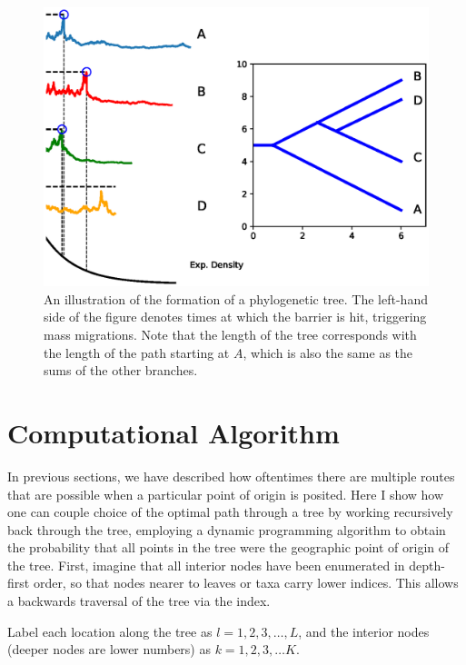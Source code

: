 \documentclass[11pt]{article}
\begin{document}
\begin{figure}
\begin{center}
\includegraphics[width=\textwidth]{AncillaryFiles//figure3.eps}
\caption{An illustration of the formation of a phylogenetic tree. The left-hand side of the figure denotes times at which the barrier is hit, triggering mass migrations. Note that the length of the tree corresponds with the length of the path starting at $A$, which is also the same as the sums of the other branches.} \label{evo1}
\end{center} 
\end{figure}


\section{Computational Algorithm}

In previous sections, we have described how oftentimes there are multiple routes that are possible when a particular point of origin is posited. Here I show how one can couple choice of the optimal path through a tree by working recursively back through the tree, employing a dynamic programming algorithm to obtain the probability that all points in the tree were the geographic point of origin of the tree. First, imagine that all interior nodes have been enumerated in depth-first order, so that nodes nearer to leaves or taxa carry lower indices. This allows a backwards traversal of the tree via the index. 

Label each location along the tree as  $l=1,2,3,\hdots,L$, and the interior nodes (deeper nodes are lower numbers) as $k=1,2,3,\hdots K$. 
\end{document}
